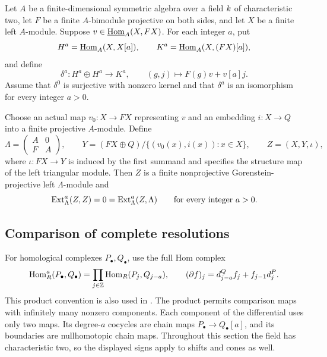 \begin{proposition}\label{conv:proposition}
Let $A$ be a finite-dimensional symmetric algebra over a field $k$
of characteristic two, let $F$ be a finite $A$-bimodule projective on
both sides, and let $X$ be a finite left $A$-module.  Suppose
$v\in\underline{\operatorname{Hom}}_{A}(X,FX)$.  For each integer $a$, put
\[
 H^a=\underline{\operatorname{Hom}}_{A}(X,X[a]),\qquad
 K^a=\underline{\operatorname{Hom}}_{A}(X,(FX)[a]),
\]
and define
\begin{equation}\label{conv:delta}
 \delta^a:H^a\oplus H^a\longrightarrow K^a,
 \qquad (g,j)\longmapsto F(g)v+v[a]j.
\end{equation}
Assume that $\delta^0$ is surjective with nonzero kernel and that
$\delta^a$ is an isomorphism for every integer $a>0$.

Choose an actual map $v_0:X\to FX$ representing $v$ and an embedding
$i:X\to Q$ into a finite projective $A$-module.  Define
\begin{equation}\label{conv:finite-module}
 \Lambda=\begin{pmatrix}A&0\\F&A\end{pmatrix},\qquad
 Y=(FX\oplus Q)/\{(v_0(x),i(x)):x\in X\},\qquad
 Z=(X,Y,\iota),
\end{equation}
where $\iota:FX\to Y$ is induced by the first summand and specifies
the structure map of the left triangular module.  Then $Z$ is a finite
nonprojective Gorenstein-projective left $\Lambda$-module and
\[
 \operatorname{Ext}^a_\Lambda(Z,Z)=0=\operatorname{Ext}^a_\Lambda(Z,\Lambda)
 \qquad\text{for every integer }a>0.
\]
\end{proposition}

\subsection{Comparison of complete resolutions}

For homological complexes $P_\bullet,Q_\bullet$, use the full Hom complex
\begin{equation}\label{conv:full-hom}
 \operatorname{Hom}_R^a(P_\bullet,Q_\bullet)
   =\prod_{j\in\mathbb Z}\operatorname{Hom}_R(P_j,Q_{j-a}),
 \qquad
 (\partial f)_j=d^Q_{j-a}f_j+f_{j-1}d^P_j.
\end{equation}
This product convention is also used in \cite[Section 1.1.1]{Veliche2006}.
The product permits comparison maps with infinitely many nonzero
components.  Each component of the differential uses only two maps.
Its degree-$a$ cocycles are chain maps $P_\bullet\to Q_\bullet[a]$,
and its boundaries are nullhomotopic chain maps.  Throughout this section the
field has characteristic two, so the displayed signs apply to shifts
and cones as well.

